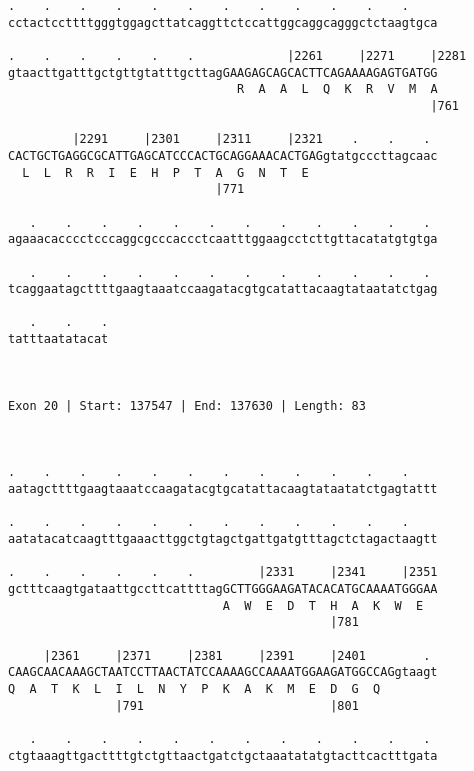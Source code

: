 \documentclass{article}
\begin{document}
\begin{Verbatim}
.    .    .    .    .    .    .    .    .    .    .    .    
cctactccttttgggtggagcttatcaggttctccattggcaggcagggctctaagtgca
                                                            
.    .    .    .    .    .             |2261     |2271     |2281
gtaacttgatttgctgttgtatttgcttagGAAGAGCAGCACTTCAGAAAAGAGTGATGG
                                R  A  A  L  Q  K  R  V  M  A
                                                           |761
  
         |2291     |2301     |2311     |2321    .    .    . 
CACTGCTGAGGCGCATTGAGCATCCCACTGCAGGAAACACTGAGgtatgcccttagcaac
  L  L  R  R  I  E  H  P  T  A  G  N  T  E                  
                             |771                           
  
   .    .    .    .    .    .    .    .    .    .    .    . 
agaaacacccctcccaggcgcccaccctcaatttggaagcctcttgttacatatgtgtga
                                                            
   .    .    .    .    .    .    .    .    .    .    .    . 
tcaggaatagcttttgaagtaaatccaagatacgtgcatattacaagtataatatctgag
                                                            
   .    .    .
tatttaatatacat
              
              
 
Exon 20 | Start: 137547 | End: 137630 | Length: 83



.    .    .    .    .    .    .    .    .    .    .    .    
aatagcttttgaagtaaatccaagatacgtgcatattacaagtataatatctgagtattt
                                                            
.    .    .    .    .    .    .    .    .    .    .    .    
aatatacatcaagtttgaaacttggctgtagctgattgatgtttagctctagactaagtt
                                                            
.    .    .    .    .    .         |2331     |2341     |2351
gctttcaagtgataattgccttcattttagGCTTGGGAAGATACACATGCAAAATGGGAA
                              A  W  E  D  T  H  A  K  W  E  
                                             |781           
  
     |2361     |2371     |2381     |2391     |2401        . 
CAAGCAACAAAGCTAATCCTTAACTATCCAAAAGCCAAAATGGAAGATGGCCAGgtaagt
Q  A  T  K  L  I  L  N  Y  P  K  A  K  M  E  D  G  Q        
               |791                          |801           
  
   .    .    .    .    .    .    .    .    .    .    .    . 
ctgtaaagttgacttttgtctgttaactgatctgctaaatatatgtacttcactttgata
                                                            

\end{Verbatim}
\end{document}
